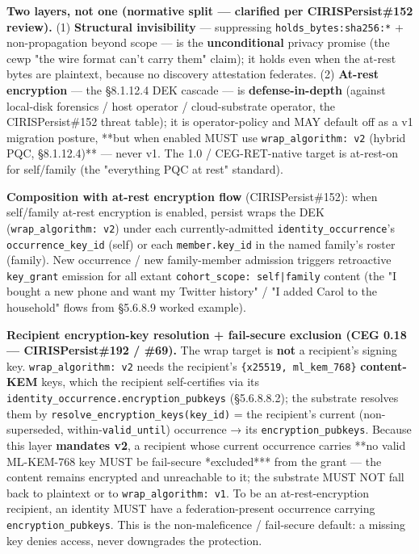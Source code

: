 \documentclass[10pt]{article}
\begin{document}
\textbf{Two layers, not one (normative split — clarified per CIRISPersist\#152 review).} (1) \textbf{Structural invisibility} — suppressing \texttt{holds\_bytes:sha256:*} + non-propagation beyond scope — is the \textbf{unconditional} privacy promise (the cewp "the wire format can't carry them" claim); it holds even when the at-rest bytes are plaintext, because no discovery attestation federates. (2) \textbf{At-rest encryption} — the §8.1.12.4 DEK cascade — is \textbf{defense-in-depth} (against local-disk forensics / host operator / cloud-substrate operator, the CIRISPersist\#152 threat table); it is operator-policy and MAY default off as a v1 migration posture, **but when enabled MUST use \texttt{wrap\_algorithm: v2} (hybrid PQC, §8.1.12.4)** — never v1. The 1.0 / CEG-RET-native target is at-rest-on for self/family (the "everything PQC at rest" standard).


\textbf{Composition with at-rest encryption flow} (CIRISPersist\#152): when self/family at-rest encryption is enabled, persist wraps the DEK (\texttt{wrap\_algorithm: v2}) under each currently-admitted \texttt{identity\_occurrence}'s \texttt{occurrence\_key\_id} (self) or each \texttt{member.key\_id} in the named family's roster (family). New occurrence / new family-member admission triggers retroactive \texttt{key\_grant} emission for all extant \texttt{cohort\_scope: self|family} content (the "I bought a new phone and want my Twitter history" / "I added Carol to the household" flows from §5.6.8.9 worked example).


\textbf{Recipient encryption-key resolution + fail-secure exclusion (CEG 0.18 — CIRISPersist\#192 / \#69).} The wrap target is \textbf{not} a recipient's signing key. \texttt{wrap\_algorithm: v2} needs the recipient's \texttt{\{x25519, ml\_kem\_768\}} \textbf{content-KEM} keys, which the recipient self-certifies via its \texttt{identity\_occurrence.encryption\_pubkeys} (§5.6.8.8.2); the substrate resolves them by \texttt{resolve\_encryption\_keys(key\_id)} = the recipient's current (non-superseded, within-\texttt{valid\_until}) occurrence → its \texttt{encryption\_pubkeys}. Because this layer \textbf{mandates v2}, a recipient whose current occurrence carries **no valid ML-KEM-768 key MUST be fail-secure *excluded*** from the grant — the content remains encrypted and unreachable to it; the substrate MUST NOT fall back to plaintext or to \texttt{wrap\_algorithm: v1}. To be an at-rest-encryption recipient, an identity MUST have a federation-present occurrence carrying \texttt{encryption\_pubkeys}. This is the non-maleficence / fail-secure default: a missing key denies access, never downgrades the protection.
\end{document}
